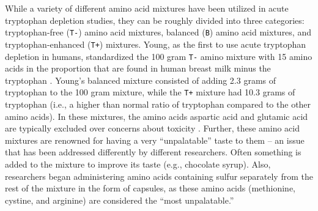 While a variety of different amino acid mixtures have been utilized in acute tryptophan depletion studies, they can be roughly divided into three categories: tryptophan-free (\texttt{T-}) amino acid mixtures, balanced (\texttt{B}) amino acid mixtures, and tryptophan-enhanced (\texttt{T+}) mixtures. Young, as the first to use acute tryptophan depletion in humans, standardized the 100 gram \texttt{T-} amino mixture with 15 amino acids in the proportion that are found in human breast milk minus the tryptophan \parencite{Young1985}. Young's balanced mixture consisted of adding 2.3 grams of tryptophan to the 100 gram mixture, while the \texttt{T+} mixture had 10.3 grams of tryptophan (i.e., a higher than normal ratio of tryptophan compared to the other amino acids). In these mixtures, the amino acids aspartic acid and glutamic acid are typically excluded over concerns about toxicity \parencite{Hood05}. Further, these amino acid mixtures are renowned for having a very ``unpalatable'' taste to them -- an issue that has been addressed differently by different researchers. Often something is added to the mixture to improve its taste (e.g., chocolate syrup). Also, researchers began administering amino acids containing sulfur separately from the rest of the mixture in the form of capsules, as these amino acids (methionine, cystine, and arginine) are considered the ``most unpalatable.''


